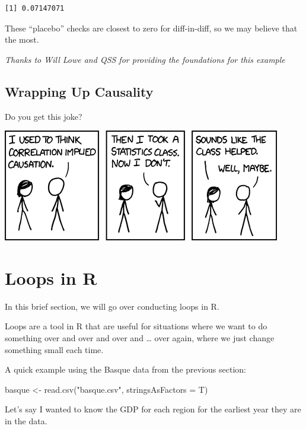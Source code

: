 \documentclass[
  letterpaper,
  DIV=11,
  numbers=noendperiod]{scrreprt}
\newenvironment{Shaded}{\begin{snugshade}}{\end{snugshade}}
\newcommand{\AttributeTok}[1]{\textcolor[rgb]{0.40,0.45,0.13}{#1}}
\newcommand{\FunctionTok}[1]{\textcolor[rgb]{0.28,0.35,0.67}{#1}}
\newcommand{\NormalTok}[1]{\textcolor[rgb]{0.00,0.23,0.31}{#1}}
\newcommand{\OtherTok}[1]{\textcolor[rgb]{0.00,0.23,0.31}{#1}}
\newcommand{\StringTok}[1]{\textcolor[rgb]{0.13,0.47,0.30}{#1}}
\begin{document}
\begin{verbatim}
[1] 0.07147071
\end{verbatim}

These ``placebo'' checks are closest to zero for diff-in-diff, so we may
believe that the most.

\emph{Thanks to Will Lowe and QSS for providing the foundations for this
example}

\hypertarget{wrapping-up-causality}{%
\section{Wrapping Up Causality}\label{wrapping-up-causality}}

Do you get this joke?

\includegraphics{images/causality-cartoon.png}


\hypertarget{loops}{%
\chapter{Loops in R}\label{loops}}

In this brief section, we will go over conducting loops in R.

Loops are a tool in R that are useful for situations where we want to do
something over and over and over and \ldots{} over again, where we just
change something small each time.

A quick example using the Basque data from the previous section:

\begin{Shaded}
\begin{Highlighting}[]
\NormalTok{basque }\OtherTok{\textless{}{-}} \FunctionTok{read.csv}\NormalTok{(}\StringTok{"basque.csv"}\NormalTok{, }\AttributeTok{stringsAsFactors =}\NormalTok{ T)}
\end{Highlighting}
\end{Shaded}

Let's say I wanted to know the GDP for each region for the earliest year
they are in the data.
\end{document}
